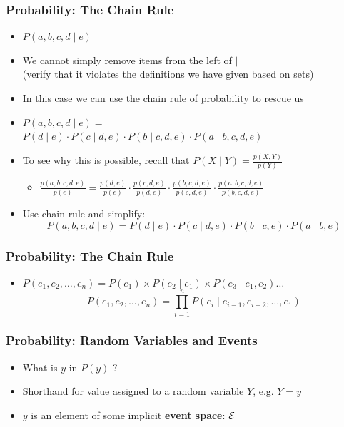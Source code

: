\documentclass[handout]{beamer}
\begin{document}
\begin{frame}
\frametitle{Probability: The Chain Rule}
\begin{itemize}[<+->]
\item $P(a,b,c,d \mid e)$
\item We cannot simply remove items from the left of $\mid$ \\
(verify that it violates the definitions we have given based on sets)
\item In this case we can use the chain rule of probability to rescue
  us
\item $P(a,b,c,d \mid e) = $\\
$P(d \mid e) \cdot P(c \mid d,e) \cdot P(b \mid c,d,e) \cdot P(a \mid b,c,d,e)$ 
\item To see why this is possible, recall that \( P(X \mid Y) = \frac{p(X,Y)}{p(Y)} \)
\begin{itemize}
\item $\frac{ p(a,b,c,d,e) }{ p(e) } = \frac{p(d,e)}{p(e)} \cdot \frac{p(c,d,e)}{p(d,e)} \cdot \frac{p(b,c,d,e)}{p(c,d,e)} \cdot \frac{p(a,b,c,d,e)}{p(b,c,d,e)} $
\end{itemize}
\item Use chain rule and simplify:
\[ P(a,b,c,d \mid e) = P(d \mid e) \cdot P(c \mid d, e) \cdot P(b \mid c, e) \cdot P(a \mid b, e) \]
\end{itemize}

\end{frame}

\begin{frame}
\frametitle{Probability: The Chain Rule}
\begin{itemize}[<+->]
\item $P(e_1, e_2, \ldots, e_n) = P(e_1) \times P(e_2 \mid
  e_1) \times P(e_3 \mid e_1, e_2) \ldots $ 
\[ P(e_1, e_2, \ldots, e_n) = \prod^n_{i=1} P(e_i \mid e_{i-1},
  e_{i-2}, \ldots, e_1) \]
\end{itemize}

\end{frame}

\begin{frame}
\frametitle{Probability: Random Variables and Events}
\begin{itemize}[<+->]
\item What is $y$ in $P(y)$ ?
\item Shorthand for value assigned to a random variable $Y$, e.g. $Y = y$
\item $y$ is an element of some implicit {\bf event space}: ${\cal E}$
\end{itemize}

\end{frame}
\end{document}
